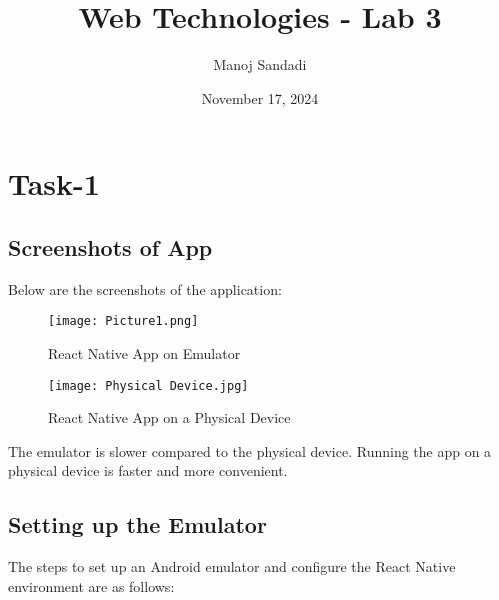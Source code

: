 \documentclass{article}
\title{\Huge Web Technologies - Lab 3}
\author{Manoj Sandadi}
\date{November 17, 2024}
\begin{document}
\maketitle
\newpage
\section{Task-1}
\subsection{Screenshots of App}

Below are the screenshots of the application:

\begin{figure}[H]
    \centering
    \begin{minipage}{0.3\textwidth}
        \centering
        \texttt{[image: Picture1.png]} %
        \caption{React Native App on Emulator}
        \label{fig:emulator-screenshot}
    \end{minipage}
    \hfill
    \begin{minipage}{0.3\textwidth}
        \centering
        \texttt{[image: Physical Device.jpg]} %
        \caption{React Native App on a Physical Device}
        \label{fig:device-screenshot}
    \end{minipage}
\end{figure}

\vspace{0.2cm}

The emulator is slower compared to the physical device. Running the app on a physical device is faster and more convenient.

\subsection{Setting up the Emulator}

The steps to set up an Android emulator and configure the React Native environment are as follows:
\end{document}
